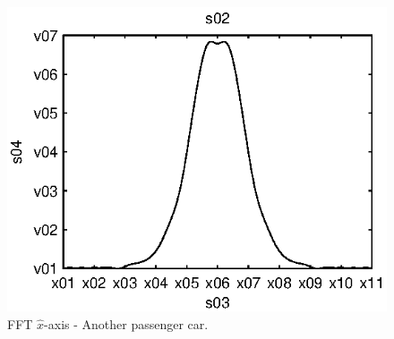 \begin{subfigures}
\begin{figure}[tfhb]
\begin{minipage}{0.45\linewidth}
	\includegraphics[width=1\linewidth]{images/fft-car3-x}
  	\caption[FFT $\hat{x}$-axis - Another passenger car]{FFT $\hat{x}$-axis - Another passenger car.}
  	\label{fig:fft-car3-x} 
 \end{minipage}
   

\end{figure}
\end{subfigures}
